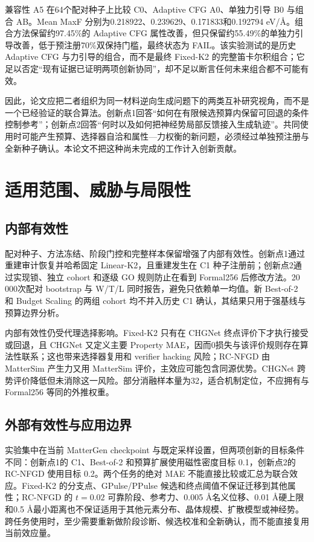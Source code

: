 兼容性 A5 在64个配对种子上比较 C0、Adaptive CFG A0、单独力引导 B0 与组合 AB。Mean MaxF 分别为0.218922、0.239629、0.171833和0.192794 eV/Å。组合方法保留约97.45\%的 Adaptive CFG 属性改善，但只保留约55.49\%的单独力引导改善，低于预注册70\%双保持门槛，最终状态为 FAIL。该实验测试的是历史 Adaptive CFG 与力引导的组合，而不是最终 Fixed-K2 的完整笛卡尔积组合；它足以否定``现有证据已证明两项创新协同''，却不足以断言任何未来组合都不可能有效。

因此，论文应把二者组织为同一材料逆向生成问题下的两类互补研究视角，而不是一个已经验证的联合算法。创新点1回答``如何在有限候选预算内保留可回退的条件控制参考''；创新点2回答``何时以及如何把神经势局部反馈接入生成轨迹''。共同使用时可能产生预算、选择器自洽和属性---力权衡的新问题，必须经过单独预注册与全新种子确认。本论文不把这种尚未完成的工作计入创新贡献。

\section{适用范围、威胁与局限性}

\subsection{内部有效性}

配对种子、方法冻结、阶段门控和完整样本保留增强了内部有效性。创新点1通过重建审计恢复并哈希固定 Linear-K2，且重建发生在 C1 种子注册前；创新点2通过实现锁、独立 cohort 和逐级 GO 规则防止在看到 Formal256 后修改方法。20 000次配对 bootstrap 与 W/T/L 同时报告，避免只依赖单一均值。新 Best-of-2 和 Budget Scaling 的两组 cohort 均不并入历史 C1 确认，其结果只用于强基线与预算边界分析。

内部有效性仍受代理选择影响。Fixed-K2 只有在 CHGNet 终点评价下才执行接受或回退，且 CHGNet 又定义主要 Property MAE，因而0损失与该评价规则存在算法性联系；这也带来选择器复用和 verifier hacking 风险；RC-NFGD 由 Matter\allowbreak Sim 产生力又用 Matter\allowbreak Sim 评价，主效应可能包含同源优势。CHGNet 跨势评价降低但未消除这一风险。部分消融样本量为32，适合机制定位，不应拥有与 Formal256 等同的外推权重。

\subsection{外部有效性与应用边界}

实验集中在当前 MatterGen checkpoint 与既定采样设置，但两项创新的目标条件不同：创新点1的 C1、Best-of-2 和预算扩展使用磁性密度目标 0.1，创新点2的 RC-NFGD 使用目标 0.2。两个任务的绝对 MAE 不能直接比较或汇总为联合效应。Fixed-K2 的分支点、GPulse/PPulse 候选和终点阈值不保证迁移到其他属性；RC-NFGD 的 \(t=0.02\) 可靠阶段、参考力、0.005 Å名义位移、0.01 Å硬上限和0.5 Å最小距离也不保证适用于其他元素分布、晶体规模、扩散模型或神经势。跨任务使用时，至少需要重新做阶段诊断、候选校准和全新确认，而不能直接复用当前效应量。

